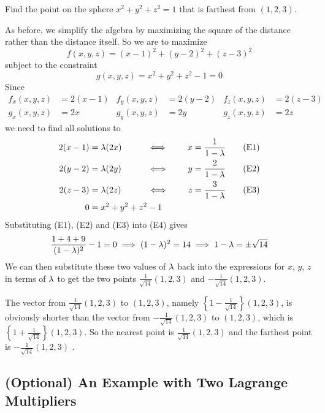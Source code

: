 \begin{eg}\label{eg LagrangeE}
Find the point on the sphere $x^2+y^2+z^2=1$ that is farthest
from $(1,2,3)$. 

\soln 
As before, we simplify the algebra by maximizing the square 
of the distance rather than the distance itself. So we are to maximize 
\begin{equation*}
f(x,y,z) = (x-1)^2 +(y-2)^2 + (z-3)^2
\end{equation*}
subject to the constraint 
\begin{equation*}
g(x,y,z)= x^2 + y^2 + z^2 -1=0
\end{equation*}
Since
\begin{align*}
f_x(x,y,z)&=2(x-1)  & f_y(x,y,z)&=2(y-2) & f_z(x,y,z)&=2(z-3) \\
g_x(x,y,z)&=2x      & g_y(x,y,z)&=2y     & g_z(x,y,z)&= 2z
\end{align*}
we need to find all solutions to
\begin{alignat*}{3}
2(x-1)&=\la (2x)\qquad&\iff\qquad 
       x&=\frac{1}{1-\la}  \tag{E1}\\
2(y-2)&=\la (2y)\qquad&\iff\qquad
       y&=\frac{2}{1-\la}  \tag{E2}\\
2(z-3)&=\la (2z)\qquad&\iff\qquad
         z&=\frac{3}{1-\la}  \tag{E3}\\
0&=x^2+y^2+z^2-1 \hidewidth \tag{E4}
\end{alignat*}
Substituting (E1), (E2) and (E3) into (E4) gives
\begin{align*}
\frac{1+4+9}{(1-\lambda)^2}-1=0
\implies (1-\lambda)^2 = 14
\implies 1-\lambda = \pm\sqrt{14}
\end{align*}
We can then substitute these two values of $\lambda$ back into the expressions
for $x$, $y$, $z$ in terms of $\lambda$ to get the two points
$\frac{1}{\sqrt{14}}(1,2,3)$ and $-\frac{1}{\sqrt{14}}(1,2,3)$.

The vector from $\frac{1}{\sqrt{14}}(1,2,3)$ to $(1,2,3)$,
  namely  $\left\{1-\frac{1}{\sqrt{14}}\right\}(1,2,3)$, is obviously
shorter than the vector from  $-\frac{1}{\sqrt{14}}(1,2,3)$ to $(1,2,3)$,
which is  $\left\{1+\frac{1}{\sqrt{14}}\right\}(1,2,3)$.
So the nearest point is $\frac{1}{\sqrt{14}}(1,2,3)$ and the farthest 
point is $-\frac{1}{\sqrt{14}}(1,2,3)$ .
\end{eg}




 

\subsection{(Optional) An Example with Two Lagrange Multipliers}
 \label{sec double Lagrange}

